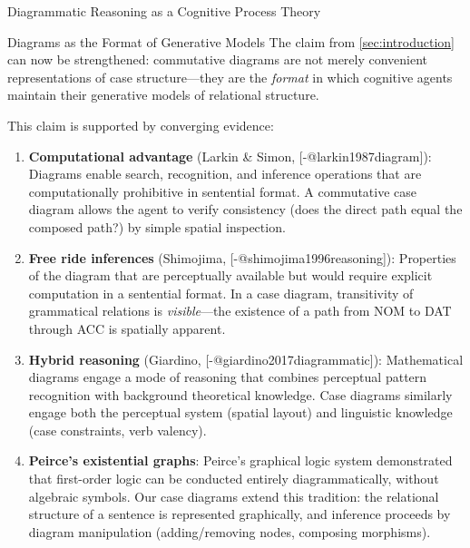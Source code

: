 \documentclass[
  ignorenonframetext,
]{beamer}
\begin{document}
\begin{frame}{Diagrammatic Reasoning as a Cognitive Process Theory}
\protect{}\label{diagrammatic-reasoning-as-a-cognitive-process-theory}
\begin{block}{Diagrams as the Format of Generative Models}
\protect{}\label{diagrams-as-the-format-of-generative-models}
The claim from \autoref{sec:introduction} can now be strengthened:
commutative diagrams are not merely convenient representations of case
structure---they are the \emph{format} in which cognitive agents
maintain their generative models of relational structure.

This claim is supported by converging evidence:

\begin{enumerate}
\item
  \textbf{Computational advantage} (Larkin \& Simon,
  {[}-@larkin1987diagram{]}): Diagrams enable search, recognition, and
  inference operations that are computationally prohibitive in
  sentential format. A commutative case diagram allows the agent to
  verify consistency (does the direct path equal the composed path?) by
  simple spatial inspection.
\item
  \textbf{Free ride inferences} (Shimojima,
  {[}-@shimojima1996reasoning{]}): Properties of the diagram that are
  perceptually available but would require explicit computation in a
  sentential format. In a case diagram, transitivity of grammatical
  relations is \emph{visible}---the existence of a path from NOM to DAT
  through ACC is spatially apparent.
\item
  \textbf{Hybrid reasoning} (Giardino,
  {[}-@giardino2017diagrammatic{]}): Mathematical diagrams engage a mode
  of reasoning that combines perceptual pattern recognition with
  background theoretical knowledge. Case diagrams similarly engage both
  the perceptual system (spatial layout) and linguistic knowledge (case
  constraints, verb valency).
\item
  \textbf{Peirce's existential graphs}: Peirce's graphical logic system
  demonstrated that first-order logic can be conducted entirely
  diagrammatically, without algebraic symbols. Our case diagrams extend
  this tradition: the relational structure of a sentence is represented
  graphically, and inference proceeds by diagram manipulation
  (adding/removing nodes, composing morphisms).
\end{enumerate}
\end{block}


\end{frame}
\end{document}
